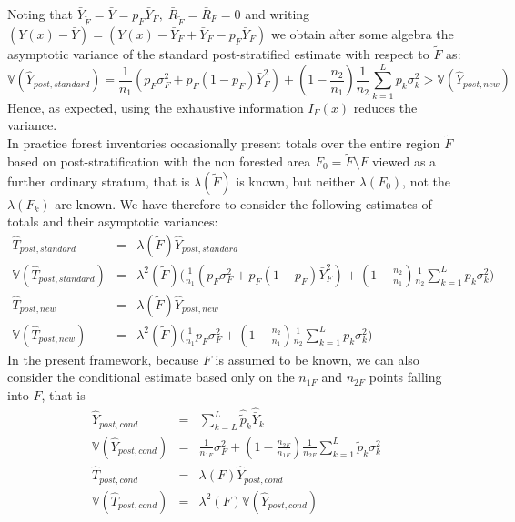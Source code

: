 \documentclass[a4paper,12pt,leqno, titlepage]{article}
\newcommand{\VAR}{\mathbb{V}}
\begin{document}
{{Noting that $\bar{Y}_{\tilde{F}}=\bar{Y}=p_F\bar{Y}_F,\;\bar{R}_{\tilde{F}}=\bar{R}_F=0$ and writing $(Y(x)-\bar{Y})=(Y(x)-\bar{Y}_F+\bar{Y}_F-p_F\bar{Y}_F)$ we obtain after some algebra the asymptotic variance of the standard post-stratified estimate with respect to $\tilde{F}$ as:
\begin{equation}\label{postvar2}
\VAR(\hat{Y}_{post,standard})=\frac{1}{n_1}(p_F\sigma^2_F + p_F(1-p_F)\bar{Y}^2_F) +(1-\frac{n_2}{n_1})\frac{1}{n_2}\sum_{k=1}^Lp_k\sigma_k^2 > \VAR(\hat{Y}_{post,new})
\end{equation}
Hence, as expected, using the exhaustive information $I_F(x)$ reduces the variance.\\
In practice forest inventories occasionally present totals over the entire region $\tilde{F}$ based on post-stratification with the non forested area $F_0=\tilde{F}\setminus F$ viewed as a further ordinary stratum, that is $\lambda(\tilde{F})$ is known, but neither $\lambda(F_0)$, not the $\lambda(F_k)$ are known. We have therefore to consider the following estimates of totals and their asymptotic variances:
\begin{eqnarray}\label{totals}
\hat{T}_{post,standard} &=& \lambda(\tilde{F})\hat{Y}_{post,standard} \nonumber \\
\VAR(\hat{T}_{post,standard}) &=& \lambda^2(\tilde{F})\Big(\frac{1}{n_1}(p_F\sigma^2_F + p_F(1-p_F)\bar{Y}^2_F) +(1-\frac{n_2}{n_1})\frac{1}{n_2}\sum_{k=1}^Lp_k\sigma_k^2\Big) \nonumber \\
\hat{T}_{post,new} &=& \lambda(\tilde{F})\hat{Y}_{post,new} \nonumber \\
\VAR(\hat{T}_{post,new}) &=& \lambda^2(\tilde{F})\Big(\frac{1}{n_1}p_F\sigma^2_F  +(1-\frac{n_2}{n_1})\frac{1}{n_2}\sum_{k=1}^Lp_k\sigma_k^2\Big)
\end{eqnarray}
 In the present framework, because $F$ is assumed to be known, we can also consider the conditional estimate based only on the $n_{1F}$ and $n_{2F}$ points falling into $F$, that is
 \begin{eqnarray}\label{postcond}
 \hat{Y}_{post,cond}&=&\sum_{k=L}^L\hat{\tilde{p}}_k\hat{\bar{Y}}_k \nonumber \\
 \VAR(\hat{Y}_{post,cond}) &=& \frac{1}{n_{1F}}\sigma^2_F+(1-\frac{n_{2F}}{n_{1F}})\frac{1}{n_{2F}}\sum_{k=1}^L\tilde{p}_k\sigma_k^2 \nonumber \\
 \hat{T}_{post,cond}&=& \lambda(F) \hat{Y}_{post,cond} \nonumber \\
 \VAR(\hat{T}_{post,cond}) &=& \lambda^2(F)\VAR(\hat{Y}_{post,cond})
 \end{eqnarray}
}}
\end{document}
